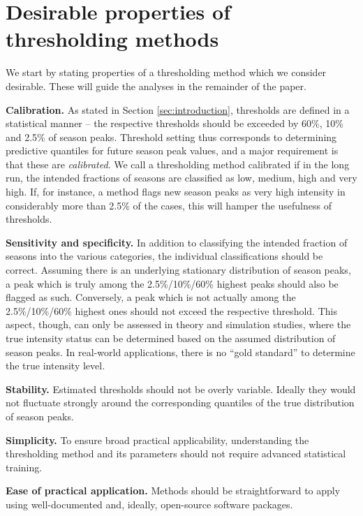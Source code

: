 \documentclass[12pt]{article}
\begin{document}
\section{Desirable properties of thresholding methods}
\label{sec:desirable_properties}

We start by stating properties of a thresholding method which we consider desirable. These will guide the analyses in the remainder of the paper.

\begin{description}
\item \textbf{Calibration.} As stated in Section \ref{sec:introduction}, thresholds are defined in a statistical manner -- the respective thresholds should be exceeded by 60\%, 10\% and 2.5\% of season peaks. Threshold setting thus corresponds to determining predictive quantiles for future season peak values, and a major requirement is that these are \textit{calibrated}. We call a thresholding method calibrated if in the long run, the intended fractions of seasons are classified as low, medium, high and very high. If, for instance, a method flags new season peaks as very high intensity in considerably more than 2.5\% of the cases, this will hamper the usefulness of thresholds.
\item \textbf{Sensitivity and specificity.} In addition to classifying the intended fraction of seasons into the various categories, the individual classifications should be correct. Assuming there is an underlying stationary distribution of season peaks, a peak which is truly among the 2.5\%/10\%/60\% highest peaks should also be flagged as such. Conversely, a peak which is not actually among the 2.5\%/10\%/60\% highest ones should not exceed the respective threshold. This aspect, though, can only be assessed in theory and simulation studies, where the true intensity status can be determined based on the assumed distribution of season peaks. In real-world applications, there is no ``gold standard'' to determine the true intensity level.
\item \textbf{Stability.} Estimated thresholds should not be overly variable. Ideally they would not fluctuate strongly around the corresponding quantiles of the true distribution of season peaks.
\item \textbf{Simplicity.} To ensure broad practical applicability, understanding the thresholding method and its parameters should not require advanced statistical training.
\item \textbf{Ease of practical application.} Methods should be straightforward to apply using well-documented and, ideally, open-source software packages.
\end{description}
\end{document}
